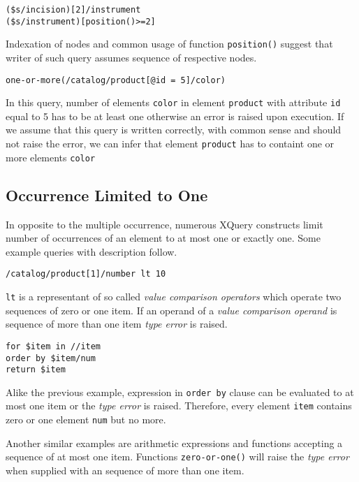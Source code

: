 \begin{verbatim}
($s/incision)[2]/instrument
($s/instrument)[position()>=2]
\end{verbatim}

Indexation of nodes and common usage of function \texttt{position()} suggest that writer of such query assumes sequence of respective nodes.

\begin{verbatim}
one-or-more(/catalog/product[@id = 5]/color)
\end{verbatim}

In this query, number of elements \texttt{color} in element \texttt{product} with attribute \texttt{id} equal to 5 has to be at least one otherwise an error is raised upon execution. If we assume that this query is written correctly, with common sense and should not raise the error, we can infer that element \texttt{product} has to containt one or more elements \texttt{color}

\subsection{Occurrence Limited to One}
In opposite to the multiple occurrence, numerous XQuery constructs limit number of occurrences of an element to at most one or exactly one. Some example queries with description follow.

\begin{verbatim}
/catalog/product[1]/number lt 10
\end{verbatim}

\texttt{lt} is a representant of so called \emph{value comparison operators} which operate two sequences of zero or one item. If an operand of a \emph{value comparison operand} is sequence of more than one item \emph{type error} is raised.

\begin{verbatim}
for $item in //item 
order by $item/num 
return $item
\end{verbatim}

Alike the previous example, expression in \texttt{order by} clause can be evaluated to at most one item or the \emph{type error} is raised. Therefore, every element \texttt{item} contains zero or one element \texttt{num} but no more.

Another similar examples are arithmetic expressions and functions accepting a sequence of at most one item. Functions \texttt{zero-or-one()} will raise the \emph{type error} when supplied with an sequence of more than one item.

